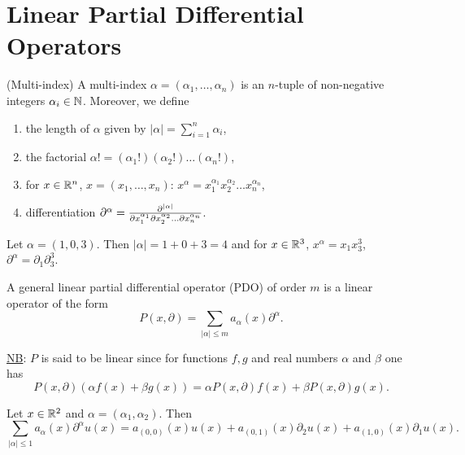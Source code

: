 \documentclass[11pt]{article}
\begin{document}
		\section{Linear Partial Differential Operators}

			\begin{defi}
				(Multi-index) A multi-index $\alpha=(\alpha_1,\dots,\alpha_n)$ is an $n$-tuple of non-negative integers $\alpha_i\in\N$. Moreover, we define
				\begin{enumerate}
					\item the length of $\alpha$ given by $|\alpha|=\sum_{i=1}^n\alpha_i$,
					\item the factorial $\alpha!=(\alpha_1!)(\alpha_2!)\dots(\alpha_n!)$,
					\item for $x\in\R^n$, $x=(x_1,\dots,x_n)$: $x^\alpha=x_1^{\alpha_1}x_2^{\alpha_2}\dots x_n^{\alpha_n}$,
					\item differentiation $\partial^\alpha=\del[|\alpha|]{}{x_1^{\alpha_1}\partial x_2^{\alpha_2}\dots\partial x_n^{\alpha_n}}$.
				\end{enumerate}
			\end{defi}

			\begin{eg}
				Let $\alpha=(1,0,3)$. Then $|\alpha|=1+0+3=4$ and for $x\in\R^3$, $x^\alpha=x_1x_3^3$, $\partial^\alpha=\partial_1\partial_3^3$.
			\end{eg}

			\begin{defi}
				A general linear partial differential operator (PDO) of order $m$ is a linear operator of the form
				\begin{equation*}
					P(x,\partial)=\sum_{|\alpha|\le m}a_\alpha(x)\partial^\alpha.
				\end{equation*}
			\end{defi}

			\noindent\underline{NB}: $P$ is said to be linear since for functions $f,g$ and real numbers $\alpha$ and $\beta$ one has $$P(x,\partial)(\alpha f(x)+ \beta g(x))=\alpha P(x,\partial)f(x)+ \beta P(x,\partial)g(x).$$

			\begin{eg}
				Let $x\in\R^2$ and $\alpha=(\alpha_1,\alpha_2)$. Then
				\begin{equation*}
					\sum_{|\alpha|\le 1}a_\alpha(x)\partial^\alpha u(x)=a_{(0,0)}(x)u(x)+a_{(0,1)}(x)\partial_2u(x)+a_{(1,0)}(x)\partial_1u(x).
				\end{equation*}
			\end{eg}
\end{document}
